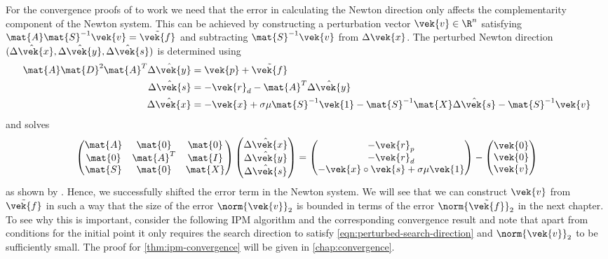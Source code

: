 For the convergence proofs of \textcite{Monteiro-ConvergenceAnalysisLongStepInfeasibleIPMs} to work we need that the error in calculating the Newton direction only affects the complementarity component of the Newton system.
This can be achieved by constructing a perturbation vector \(\vek{v} \in \R^n\) satisfying \(\mat{A}\mat{S}^{-1}\vek{v} = \tilde{\vek{f}}\) and subtracting \(\mat{S}^{-1}\vek{v}\) from \(\Delta\vek{x}\).
The perturbed Newton direction \((\hat{\Delta\vek{x}}, \hat{\Delta\vek{y}}, \hat{\Delta\vek{s}})\) is determined using
\begin{subequations}\label{eqn:perturbed-search-direction-choice}
  \begin{align}
    \mat{A} \mat{D}^2 \mat{A}^T \hat{\Delta\vek{y}} &= \vek{p} + \tilde{\vek{f}} \\
    \hat{\Delta\vek{s}} &= -\vek{r}_d - \mat{A}^T \hat{\Delta\vek{y}} \\
    \hat{\Delta\vek{x}} &= -\vek{x} + \sigma \mu \mat{S}^{-1} \vek{1} - \mat{S}^{-1} \mat{X} \hat{\Delta\vek{s}} - \mat{S}^{-1} \vek{v}
  \end{align}
\end{subequations}
and solves
\begin{equation}\label{eqn:perturbed-search-direction}
  \begin{pmatrix}
    \mat{A} & \mat{0}   & \mat{0} \\
    \mat{0} & \mat{A}^T & \mat{I} \\
    \mat{S} & \mat{0}   & \mat{X} \\
  \end{pmatrix}
  \begin{pmatrix} \hat{\Delta\vek{x}} \\ \hat{\Delta\vek{y}} \\ \hat{\Delta\vek{s}} \end{pmatrix}
  =
  \begin{pmatrix} -\vek{r}_p \\ -\vek{r}_d \\ -\vek{x} \circ \vek{s} + \sigma \mu \vek{1} \end{pmatrix}
  -
  \begin{pmatrix} \vek{0} \\ \vek{0} \\ \vek{v} \end{pmatrix}
\end{equation}
as shown by \textcite[p. 10]{Monteiro-ConvergenceAnalysisLongStepInfeasibleIPMs}.
Hence, we successfully shifted the error term in the Newton system.
We will see that we can construct \(\vek{v}\) from \(\tilde{\vek{f}}\) in such a way that the size of the error \(\norm{\vek{v}}_2\) is bounded in terms of the error \(\norm{\tilde{\vek{f}}}_2\) in the next chapter.
To see why this is important, consider the following IPM algorithm and the corresponding convergence result
and note that apart from conditions for the initial point it only requires the search direction to satisfy \cref{eqn:perturbed-search-direction} and \(\norm{\vek{v}}_2\) to be sufficiently small.
The proof for \cref{thm:ipm-convergence} will be given in \cref{chap:convergence}.

